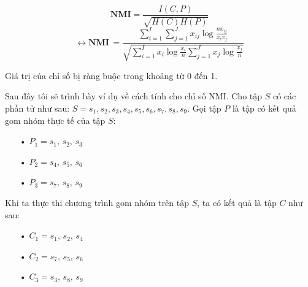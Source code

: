 \begin{center}
\begin{equation}
\textbf{NMI} = \frac{I(C,P)}{\sqrt{H(C)H(P)}}
\end{equation}
\begin{equation} \label{eq:NMI}
\longleftrightarrow \textbf{NMI} \, = \frac{\sum^I_{i=1} \sum^J_{j=1} x_{ij} \log \frac{n x_{ij}}{x_i x_j}}{\sqrt{\sum^I_{i=1} x_i \log \frac{x_i}{n} \sum^J_{j=1} x_j \log \frac{x_j}{n}}}
\end{equation}
\end{center}

Giá trị của chỉ số bị ràng buộc trong khoảng từ 0 đến 1.

Sau đây tôi sẽ trình bày ví dụ về cách tính cho chỉ số NMI.
Cho tập $S$ có các phần tử như sau: $S = {s_1, s_2, s_3, s_4, s_5, s_6, s_7, s_8, s_9}$.
Gọi tập $P$ là tập có kết quả gom nhóm thực tế của tập $S$:
\begin{enumerate}
\item[•] $P_1 = {s_1, \, s_2, \, s_3}$
\item[•] $P_2 = {s_4, \, s_5, \, s_6}$
\item[•] $P_3 = {s_7, \, s_8, \, s_9}$
\end{enumerate}
Khi ta thực thi chương trình gom nhóm trên tập $S$, ta có kết quả là tập $C$ như sau:
\begin{enumerate}
\item[•] $C_1 = {s_1, \, s_2, \, s_4}$
\item[•] $C_2 = {s_7, \, s_5, \, s_6}$
\item[•] $C_3 = {s_3, \, s_8, \, s_9}$
\end{enumerate}
%
%

